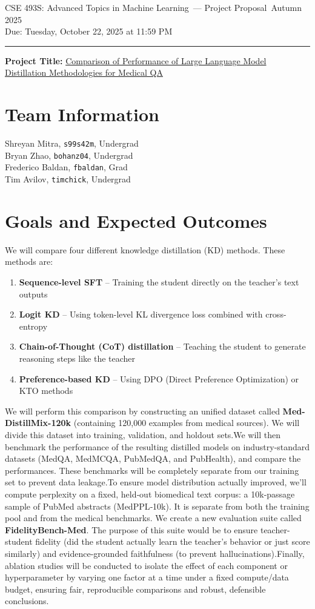 \documentclass[10pt]{article}
\newcommand{\coursename}{CSE 493S: Advanced Topics in Machine Learning}
\newcommand{\term}{Autumn 2025}
\newcommand{\duedate}{Tuesday, October 22, 2025 at 11:59 PM}
\begin{document}
{\large \coursename\ — Project Proposal}\
{\normalsize \term \hfill  \\ Due: \duedate}
\par\noindent\rule{\linewidth}{0.4pt}

\textbf{Project Title:} \underline{Comparison of Performance of Large Language Model Distillation Methodologies for Medical QA}

\section*{Team Information}
Shreyan Mitra, \texttt{s99s42m}, Undergrad
\\
Bryan Zhao, \texttt{bohanz04}, Undergrad
\\
Frederico Baldan, \texttt{fbaldan}, Grad
\\
Tim Avilov, \texttt{timchick}, Undergrad \\

\section*{Goals and Expected Outcomes}

We will compare four different knowledge distillation (KD) methods. These methods are:
\begin{enumerate}
    \item \textbf{Sequence-level SFT} -- Training the student directly on the teacher's text outputs
    \item \textbf{Logit KD} -- Using token-level KL divergence loss combined with cross-entropy
    \item \textbf{Chain-of-Thought (CoT) distillation} -- Teaching the student to generate reasoning steps like the teacher
    \item \textbf{Preference-based KD} -- Using DPO (Direct Preference Optimization) or KTO methods
\end{enumerate}

We will perform this comparison by constructing an unified dataset called \textbf{Med-DistillMix-120k} (containing 120,000 examples from medical sources). We will divide this dataset into training, validation, and holdout sets.We will then benchmark the performance of the resulting distilled models on industry-standard datasets (MedQA, MedMCQA, PubMedQA, and PubHealth), and compare the performances. These benchmarks will be completely separate from our training set to prevent data leakage.To ensure model distribution actually improved, we'll compute perplexity on a fixed, held‑out biomedical text corpus: a 10k‑passage sample of PubMed abstracts (MedPPL‑10k). It is separate from both the training pool and from the medical benchmarks. We create a new evaluation suite called \textbf{FidelityBench-Med}. The purpose of this suite would be to ensure teacher-student fidelity (did the student actually learn the teacher's behavior or just score similarly) and evidence-grounded faithfulness (to prevent hallucinations).Finally, ablation studies will be conducted to isolate the effect of each component or hyperparameter by varying one factor at a time under a fixed compute/data budget, ensuring fair, reproducible comparisons and robust, defensible conclusions.
\end{document}
